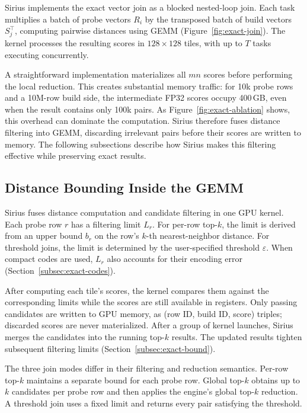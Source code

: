 Sirius implements the exact vector join as a blocked nested-loop join.
Each task multiplies a batch of probe vectors $R_i$ by the transposed
batch of build vectors $S_j^\top$, computing pairwise distances using
GEMM (Figure~\ref{fig:exact-join}). The kernel processes the resulting
scores in $128\times128$ tiles, with up to $T$ tasks executing
concurrently.

A straightforward implementation materializes all $mn$ scores before
performing the local reduction. This creates substantial memory traffic:
for 10k probe rows and a 10M-row build side, the intermediate FP32
scores occupy 400\,GB, even when the result contains only 100k pairs.
As Figure~\ref{fig:exact-ablation} shows, this overhead can dominate
the computation. Sirius therefore fuses distance filtering into GEMM,
discarding irrelevant pairs before their scores are written to memory.
The following subsections describe how Sirius makes this filtering
effective while preserving exact results.


\subsection{Distance Bounding Inside the GEMM}\label{subsec:exact-kernel}

Sirius fuses distance computation and candidate filtering in one GPU
kernel. Each probe row $r$ has a filtering limit $L_r$. For per-row
top-$k$, the limit is derived from an upper bound $b_r$ on the
row's $k$-th nearest-neighbor distance. For threshold joins, the limit
is determined by the user-specified threshold $\varepsilon$. When
compact codes are used, $L_r$ also accounts for their encoding error
(Section~\ref{subsec:exact-codes}).

After computing each tile's scores, the kernel compares them against
the corresponding limits while the scores are still available in
registers. Only passing candidates are written to GPU memory, as
(row ID, build ID, score) triples; discarded scores are never
materialized. After a group of kernel launches, Sirius merges the
candidates into the running top-$k$ results. The updated results tighten subsequent
filtering limits (Section~\ref{subsec:exact-bound}).

The three join modes differ in their filtering and reduction semantics.
Per-row top-$k$ maintains a separate bound for each probe row. Global
top-$k$ obtains up to $k$ candidates per probe row and then applies
the engine's global top-$k$ reduction. A threshold join uses a fixed
limit and returns every pair satisfying the threshold.



